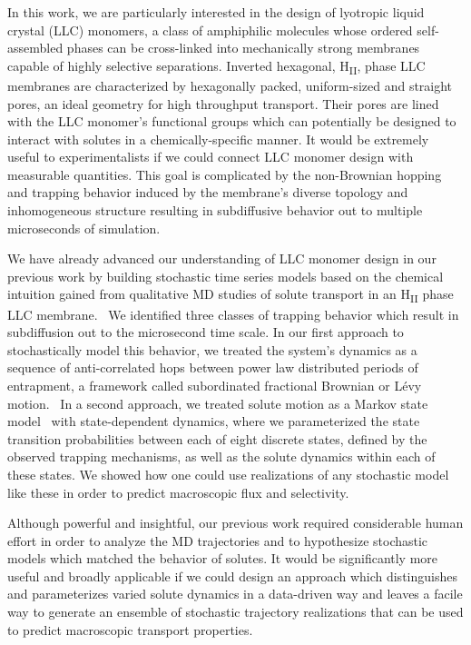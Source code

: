 \documentclass[journal=jpcbfk,manuscript=article]{achemso}
\begin{document}
  In this work, we are particularly interested in the design of lyotropic liquid 
  crystal (LLC) monomers, a class of amphiphilic molecules whose ordered self-assembled
  phases can be cross-linked into mechanically strong membranes capable of highly 
  selective separations. Inverted hexagonal, H\textsubscript{II}, phase LLC membranes
  are characterized	by hexagonally packed, uniform-sized and straight pores, an ideal
  geometry for high throughput transport. Their pores are lined with the LLC monomer's
  functional groups which can potentially be designed to interact with solutes in a 
  chemically-specific manner. It would be extremely useful to experimentalists if we 
  could connect LLC monomer design with measurable quantities. This goal is complicated
  by the non-Brownian hopping and trapping behavior induced by the membrane's diverse
  topology and inhomogeneous structure resulting in subdiffusive behavior out to 
  multiple microseconds of simulation.~\cite{coscia_understanding_2019,coscia_chemically_2019}

  We have already advanced our understanding of LLC monomer design in our previous work
  by building stochastic time series models based on the chemical intuition gained
  from qualitative MD studies of solute transport in an H\textsubscript{II} phase LLC
  membrane.~\cite{coscia_chemically_2019,coscia_capturing_2020} We identified three 
  classes of trapping behavior which result in subdiffusion out to the microsecond 
  time scale. In our first approach to stochastically model this behavior, we treated 
  the system's dynamics as a sequence of anti-correlated hops between power law distributed periods of 
  entrapment, a framework called subordinated fractional Brownian or L\'evy
  motion.~\cite{thiel_weak_2014,teuerle_modeling_2013} In a second approach, we treated 
  solute motion as a Markov state model~\cite{pande_everything_2010} with state-dependent
  dynamics, where we parameterized the state transition probabilities between each of
  eight discrete states, defined by the observed trapping mechanisms, as well as the 
  solute dynamics within each of these states. We showed how one could use realizations
  of any stochastic model like these in order to predict macroscopic flux and selectivity. 
  
  Although powerful and insightful, our previous work required considerable human effort
  in order to analyze the MD trajectories and to hypothesize stochastic models which
  matched the behavior of solutes. It would be significantly more useful and broadly 
  applicable if we could design an approach which distinguishes and parameterizes varied
  solute dynamics in a data-driven way and leaves a facile way to generate an ensemble
  of stochastic trajectory realizations that can be used to predict macroscopic transport
  properties.
  
\end{document}
